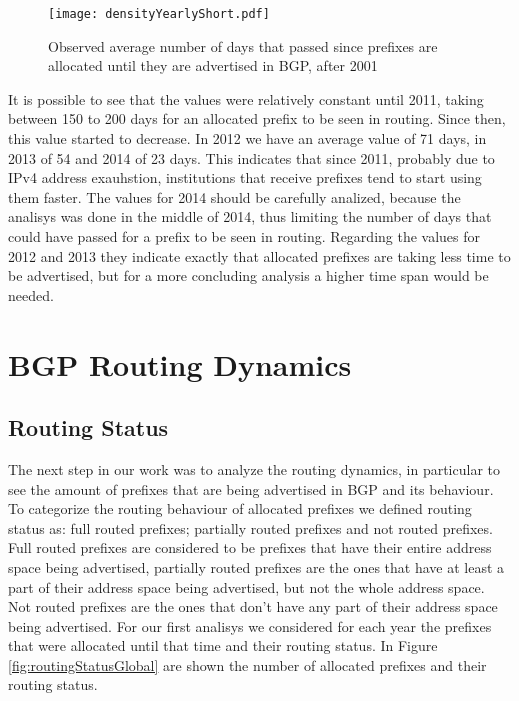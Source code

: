 \documentclass[11pt,a4paper]{scrreprt}
\begin{document}
\begin{figure}[!h]
\centering
\texttt{[image: densityYearlyShort.pdf]}
\caption{Observed average number of days that passed since prefixes are allocated until they are advertised in BGP, after 2001}
\label{fig:densityYearlyShort}
\end{figure}

It is possible to see that the values were relatively constant until 2011, taking between 150 to 200 days for an allocated prefix to be seen in routing. Since then, this value started to decrease. In 2012 we have an average value of 71 days, in 2013 of 54 and 2014 of 23 days. This indicates that since 2011, probably due to IPv4 address exauhstion, institutions that receive prefixes tend to start using them faster. The values for 2014 should be carefully analized, because the analisys was done in the middle of 2014, thus limiting the number of days that could have passed for a prefix to be seen in routing. Regarding the values for 2012 and 2013 they indicate exactly that allocated prefixes are taking less time to be advertised, but for a more concluding analysis a higher time span would be needed.  

\section{BGP Routing Dynamics}

\subsection{Routing Status}

The next step in our work was to analyze the routing dynamics, in particular to see the amount of prefixes that are being advertised in BGP and its behaviour.
To categorize the routing behaviour of allocated prefixes we defined routing status as: full routed prefixes; partially routed prefixes and not routed prefixes. Full routed prefixes are considered to be prefixes that have their entire address space being advertised, partially routed prefixes are the ones that have at least a part of their address space being advertised, but not the whole address space. Not routed prefixes are the ones that don't have any part of their address space being advertised. For our first analisys we considered for each year the prefixes that were allocated until that time and their routing status. In Figure \ref{fig:routingStatusGlobal} are shown the number of allocated prefixes and their routing status. 
\end{document}
